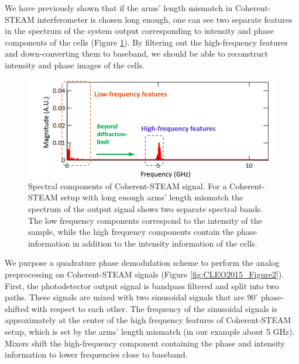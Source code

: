 We have previously \cite{mahjoubfar2014label} shown that if the arms' length mismatch in Coherent-STEAM interferometer is chosen long enough, one can see two separate features in the spectrum of the system output corresponding to intensity and phase components of the cells (Figure \ref{fig:CLEO2015_Figure1}). By filtering out the high-frequency features and down-converting them to baseband, we should be able to reconstruct intensity and phase images of the cells. 

\begin{figure}[htb!]
\centering
\includegraphics[scale=0.8]{CLEO2015/Figure1.png}
\caption{Spectral components of Coherent-STEAM signal. For a Coherent-STEAM setup with long enough arms' length mismatch the spectrum of the output signal shows two separate spectral bands. The low frequency components correspond to the intensity of the sample, while the high frequency components contain the phase information in addition to the intensity information of the cells.}
\label{fig:CLEO2015_Figure1}
\end{figure}

We purpose a quadrature phase demodulation scheme to perform the analog preprocessing on Coherent-STEAM signals (Figure \ref{fig:CLEO2015_Figure2}). First, the photodetector output signal is bandpass filtered and split into two paths. These signals are mixed with two sinusoidal signals that are $90^{\circ}$ phase-shifted with respect to each other. The frequency of the sinusoidal signals is approximately at the center of the high frequency features of Coherent-STEAM setup, which is set by the arms' length mismatch (in our example about 5 GHz). Mixers shift the high-frequency component containing the phase and intensity information to lower frequencies close to baseband. 

